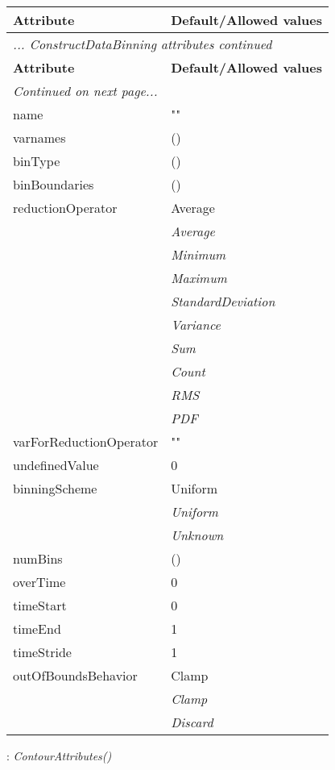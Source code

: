 \documentclass[10pt,a4paper]{report}
\begin{document}
\begin{longtable}{ll}
{\bf Attribute} & {\bf Default/Allowed values} \\
\hline \hline
\endfirsthead
\multicolumn{2}{l}{{\it ... ConstructDataBinning attributes continued}} \\
{\bf Attribute} & {\bf Default/Allowed values} \\
\hline \hline
\endhead
\hline
\multicolumn{2}{l}{{\it Continued on next page...}} \\
\endfoot
\hline
\endlastfoot

name  &  "" \\
varnames  &  () \\
binType  &  () \\
binBoundaries  &  () \\
reductionOperator  &  Average   \\
 & {\it  Average} \\
 & {\it  Minimum} \\
 & {\it  Maximum} \\
 & {\it  StandardDeviation} \\
 & {\it  Variance} \\
 & {\it  Sum} \\
 & {\it  Count} \\
 & {\it  RMS} \\
 & {\it  PDF} \\
varForReductionOperator  &  "" \\
undefinedValue  &  0 \\
binningScheme  &  Uniform   \\
 & {\it  Uniform} \\
 & {\it  Unknown} \\
numBins  &  () \\
overTime  &  0 \\
timeStart  &  0 \\
timeEnd  &  1 \\
timeStride  &  1 \\
outOfBoundsBehavior  &  Clamp   \\
 & {\it  Clamp} \\
 & {\it  Discard} \\
\end{longtable}

\newpage

{}
: {\it ContourAttributes() }\\[-3mm]
\end{document}
